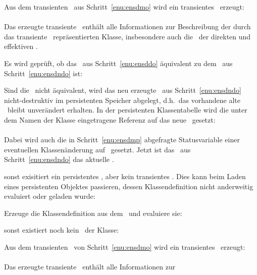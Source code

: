 \begin{infol}
\begin{block}
\begin{block}
\begin{block}
%
\item\label{enu:ensdndo} Aus dem transienten \clsmo\ aus
Schritt~\ref{enu:ensdmo} wird ein transientes \clsdo\ erzeugt:\\
\\
Das erzeugte transiente \clsdo\ enth\"{a}lt alle Informationen zur
Beschreibung der durch das transiente \clsmo\ re\-pr\"{a}\-sen\-tier\-ten
Klasse, insbesondere auch die \sltdo[e]\ der direkten und effektiven
\Slt[s].
%
\item Es wird gepr\"{u}ft, ob das \clsdo\ aus
Schritt~\ref{enu:ensddo} \"{a}quivalent zu dem \clsdo\ aus
Schritt~\ref{enu:ensdndo} ist:\\
%
\item\label{enu:ensdupd} Sind die \clsdo[e]\ nicht \"{a}quivalent, wird
das neu erzeugte \clsdo\ aus Schritt~\ref{enu:ensdndo}
nicht-destruktiv im persistenten Speicher abgelegt, d.h.\ das
vorhandene alte \clsdo\ bleibt unver\"{a}ndert erhalten. In der
persistenten Klassentabelle wird die unter dem Namen der Klasse
eingetragene Referenz auf das neue \clsdo\ gesetzt:\\
\\
Dabei wird auch die in Schritt~\ref{enu:ensdmp} abgefragte
Statusvariable einer eventuellen Klassen\"{a}nderung auf
\lispnil\ gesetzt.
Jetzt ist das \clsdo\ aus Schritt~\ref{enu:ensdndo} das aktuelle
\clsdo.
%
\end{block}%
%
\end{block}%
%
\item sonst exisitiert ein persistentes \clsdo, aber kein transientes
\clsmo. Dies kann beim Laden eines persistenten Objektes passieren,
dessen Klassendefinition nicht anderweitig evaluiert oder geladen
wurde:
%
\begin{block}%
%
\item Erzeuge die Klassendefinition aus dem \clsdo\ und evaluiere sie:\\
%
\end{block}%
\end{block}%
%
\item sonst existiert noch kein \clsdo\ der Klasse:
%
\begin{block}%
%
\item Aus dem transienten \clsmo\ von
Schritt~\ref{enu:ensdmo} wird ein transientes \clsdo\ erzeugt:\\
\\
Das erzeugte transiente \clsdo\ enth\"{a}lt alle Informationen zur

\end{block}
\end{infol}
